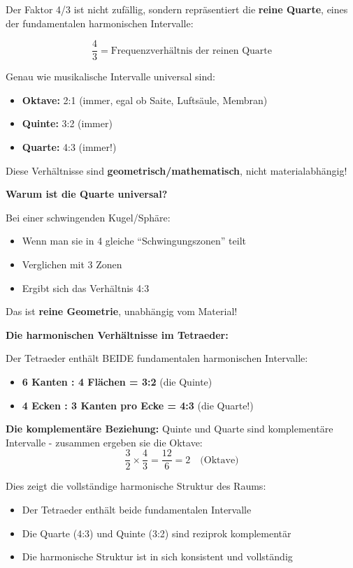 \documentclass[12pt,a4paper]{article}
\begin{document}
Der Faktor 4/3 ist nicht zufällig, sondern repräsentiert die \textbf{reine Quarte}, eines der fundamentalen harmonischen Intervalle:

\begin{equation}
	\frac{4}{3} = \text{Frequenzverhältnis der reinen Quarte}
\end{equation}

Genau wie musikalische Intervalle universal sind:
\begin{itemize}
	\item \textbf{Oktave:} 2:1 (immer, egal ob Saite, Luftsäule, Membran)
	\item \textbf{Quinte:} 3:2 (immer)
	\item \textbf{Quarte:} 4:3 (immer!)
\end{itemize}

Diese Verhältnisse sind \textbf{geometrisch/mathematisch}, nicht materialabhängig!

\textbf{Warum ist die Quarte universal?}

Bei einer schwingenden Kugel/Sphäre:
\begin{itemize}
	\item Wenn man sie in 4 gleiche ``Schwingungszonen'' teilt
	\item Verglichen mit 3 Zonen
	\item Ergibt sich das Verhältnis 4:3
\end{itemize}

Das ist \textbf{reine Geometrie}, unabhängig vom Material!

\textbf{Die harmonischen Verhältnisse im Tetraeder:}

Der Tetraeder enthält BEIDE fundamentalen harmonischen Intervalle:
\begin{itemize}
	\item \textbf{6 Kanten : 4 Flächen = 3:2} (die Quinte)
	\item \textbf{4 Ecken : 3 Kanten pro Ecke = 4:3} (die Quarte!)
\end{itemize}

\textbf{Die komplementäre Beziehung:}
Quinte und Quarte sind komplementäre Intervalle - zusammen ergeben sie die Oktave:
\begin{equation}
	\frac{3}{2} \times \frac{4}{3} = \frac{12}{6} = 2 \quad \text{(Oktave)}
\end{equation}

Dies zeigt die vollständige harmonische Struktur des Raums:
\begin{itemize}
	\item Der Tetraeder enthält beide fundamentalen Intervalle
	\item Die Quarte (4:3) und Quinte (3:2) sind reziprok komplementär
	\item Die harmonische Struktur ist in sich konsistent und vollständig
\end{itemize}
\end{document}
